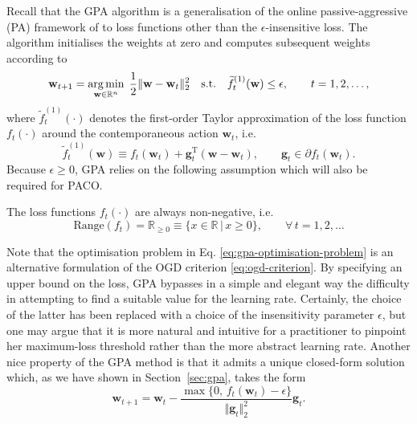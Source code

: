 Recall that the GPA algorithm is a generalisation of the online passive-aggressive (PA) framework of \citet{crammer06} to loss functions other than the $\epsilon$-insensitive loss. The algorithm initialises the weights at zero and computes subsequent weights according to
\begin{equation}
\label{eq:gpa-optimisation-problem}
	\mathbf{w}_{t+1}
	= \operatorname*{arg\,min}_{\mathbf{w} \in \mathbb{R}^n} \; \frac{1}{2}\Vert\mathbf{w} - \mathbf{w}_t\Vert_2^2
	\quad \text{s.t.} \quad \widetilde{f}_t^{(1)}(\mathbf{w}) \leq \epsilon,
	\qquad t = 1, 2, \ldots,
\end{equation}
where $\widetilde{f}_t^{(1)}(\cdot)$ denotes the first-order Taylor approximation of the loss function $f_t(\cdot)$ around the contemporaneous action $\mathbf{w}_t$, i.e.\
\begin{equation}
	\widetilde{f}_t^{(1)}(\mathbf{w})
	\equiv f_t(\mathbf{w}_t) + \mathbf{g}_t^{\text{T}}(\mathbf{w} - \mathbf{w}_t),
	\qquad \mathbf{g}_t \in \partial f_t(\mathbf{w}_t).
\end{equation}
Because $\epsilon \geq 0$, GPA relies on the following assumption which will also be required for PACO.
\begin{assumption}
\label{ass:positive-loss-functions}
The loss functions $f_t(\cdot)$ are always non-negative, i.e.\
\begin{equation}
	\mathrm{Range}(f_t)
	= \mathbb{R}_{\geq 0}
	\equiv \big\{x \in \mathbb{R} \, | \, x \geq 0\big\},
	\qquad \forall \, t = 1, 2, \ldots
\end{equation} 
\end{assumption}
Note that the optimisation problem in Eq. \eqref{eq:gpa-optimisation-problem} is an alternative formulation of the OGD criterion \eqref{eq:ogd-criterion}. By specifying an upper bound on the loss, GPA bypasses in a simple and elegant way the difficulty in attempting to find a suitable value for the learning rate. Certainly, the choice of the latter has been replaced with a choice of the insensitivity parameter $\epsilon$, but one may argue that it is more natural and intuitive for a practitioner to pinpoint her maximum-loss threshold rather than the more abstract learning rate.
Another nice property of the GPA method is that it admits a unique closed-form solution which, as we have shown in Section~\ref{sec:gpa}, takes the form
\begin{equation}
\label{eq:gpa-solution}
	\mathbf{w}_{t+1}
	= \mathbf{w}_t - \frac{\max\{0,\, f_t(\mathbf{w}_t) - \epsilon\}}{\Vert\mathbf{g}_t\Vert_2^2}\mathbf{g}_t.
\end{equation}

